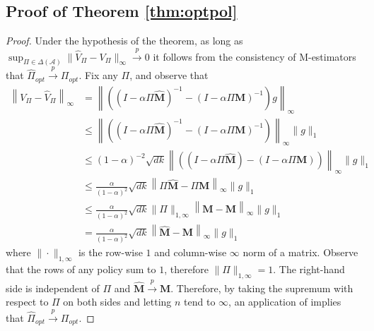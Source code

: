 \documentclass[twoside,11pt]{article}
\numberwithin{equation}{section}
\newcommand{\lp}{\left(}
\newcommand{\rp}{\right)}
\begin{document}
\subsection{Proof of Theorem \ref{thm:optpol}}\label{prf:optpol}
\begin{proof}
    Under the hypothesis of the theorem, as long as $\sup_{\Pi\in \Delta(\mathcal{A})}\|\hat V_\Pi-V_\Pi\|_{\infty}\overset{p}{\rightarrow}0$ it follows from the consistency of M-estimators \citep[Theorem 5.7]{vandervaart} that $\hat \Pi_{opt}\overset{p}{\rightarrow}\Pi_{opt}$. Fix any $\Pi$, and observe that
    \begin{align*}
        \left\|V_\Pi-\hat{V}_\Pi\right\|_{\infty} & =\left\|\lp(I-\alpha\Pi\hat{\mathbf{M}})^{-1}-(I-\alpha\Pi\mathbf{M})^{-1}\rp g\right\|_{\infty} \\
        & \leq\left\|\lp\lp I-\alpha\Pi\hat{\mathbf{M}}\rp^{-1}-\lp I-\alpha\Pi\mathbf{M}\rp^{-1}\rp\right\|_{\infty}\|g\|_{1} \\
        & \leq(1-\alpha)^{-2}\sqrt{dk}\left\|((I-\alpha\Pi\hat{\mathbf{M}})-(I-\alpha\Pi\mathbf{M}))\right\|_{\infty}\|g\|_{1} \\
        & \leq\frac{\alpha}{(1-\alpha)^{2}}\sqrt{dk}\left\|\Pi\hat{\mathbf{M}}-\Pi\mathbf{M}\right\|_{\infty}\|g\|_{1}\\
        & \leq \frac{\alpha}{(1-\alpha)^{2}}\sqrt{dk}\|\Pi\|_{1,\infty}\left\|\hat{\mathbf{M}}-\mathbf{M}\right\|_{\infty}\|g\|_{1}\\
        & = \frac{\alpha}{(1-\alpha)^{2}}\sqrt{dk}\left\|\hat{\mathbf{M}}-\mathbf{M}\right\|_{\infty}\|g\|_{1}
     \end{align*}
    where $\|\cdot\|_{1,\infty}$ is the row-wise $1$ and column-wise $\infty$ norm of a matrix. Observe that the rows of any policy sum to $1$, therefore $\|\Pi\|_{1,\infty}=1$. The right-hand side is independent of $\Pi$ and $\mathbf{\hat M}\overset{p}{\rightarrow}\mathbf{M}$. Therefore, by taking the supremum with respect to $\Pi$ on both sides and letting $n$ tend to $\infty$, an application of \citet[Theorem 5.7]{vandervaart} implies that $\hat \Pi_{opt}\overset{p}{\rightarrow}\Pi_{opt}$.


\end{proof}
\end{document}
